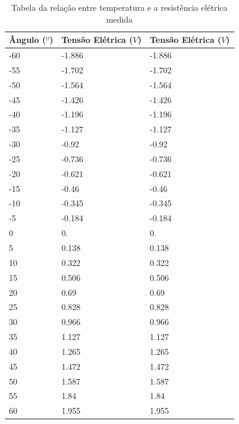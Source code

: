 \documentclass[12pt,a4paper]{instrumentacao}
\begin{document}
\begin{table}[H]
\centering
\caption{Tabela da relação entre temperatura e a resistência elétrica medida}
\begin{tabular}{|l|l|l|}
 \hline
 \textbf{Ângulo ($º$)} & \textbf{Tensão Elétrica ($V$)} & \textbf{Tensão Elétrica ($V$)} \\ \hline

 -60 & -1.886 & -1.886 	\\ \hline
 -55 & -1.702 & -1.702 	\\ \hline
 -50 & -1.564 & -1.564 	\\ \hline
 -45 & -1.426 & -1.426 	\\ \hline
 -40 & -1.196 & -1.196 	\\ \hline
 -35 & -1.127 & -1.127 	\\ \hline
 -30 & -0.92 & -0.92 	\\ \hline
 -25 & -0.736 & -0.736 	\\ \hline
 -20 & -0.621 & -0.621 	\\ \hline
 -15 & -0.46 & -0.46 	\\ \hline
 -10 & -0.345 & -0.345 	\\ \hline
 -5 & -0.184 & -0.184 	\\ \hline
 0 & 0. & 0. 			\\ \hline
 5 & 0.138 & 0.138 		\\ \hline
 10 & 0.322 & 0.322 	\\ \hline
 15 & 0.506 & 0.506 	\\ \hline
 20 & 0.69 & 0.69 		\\ \hline
 25 & 0.828 & 0.828 	\\ \hline
 30 & 0.966 & 0.966 	\\ \hline
 35 & 1.127 & 1.127 	\\ \hline
 40 & 1.265 & 1.265 	\\ \hline
 45 & 1.472 & 1.472 	\\ \hline
 50 & 1.587 & 1.587 	\\ \hline
 55 & 1.84 & 1.84 		\\ \hline
 60 & 1.955 & 1.955 	\\ \hline
 
\end{tabular}
\label{tab:pendulo-calibracao}
\end{table}
\end{document}
